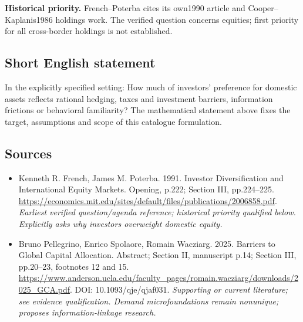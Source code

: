 \documentclass[11pt]{article}
\begin{document}
\par\textbf{Historical priority.} French–Poterba cites its own1990 article and Cooper–Kaplanis1986 holdings work. The verified question concerns equities; first priority for all cross-border holdings is not established.

\subsection{Short English statement}
In the explicitly specified setting: How much of investors’ preference for domestic assets reflects rational hedging, taxes and investment barriers, information frictions or behavioral familiarity? The mathematical statement above fixes the target, assumptions and scope of this catalogue formulation.

\subsection{Sources}
\begin{itemize}\raggedright
\item[\textnormal{[S1]}]\hypertarget{source:30007620:1}{} Kenneth R. French, James M. Poterba. 1991. Investor Diversification and International Equity Markets. Opening, p.222; Section III, pp.224–225.
\url{https://economics.mit.edu/sites/default/files/publications/2006858.pdf}.
{\small\textit{Earliest verified question/agenda reference; historical priority qualified below. Explicitly asks why investors overweight domestic equity.}}

\item[\textnormal{[S2]}]\hypertarget{source:30007620:2}{} Bruno Pellegrino, Enrico Spolaore, Romain Wacziarg. 2025. Barriers to Global Capital Allocation. Abstract; Section II, manuscript p.14; Section III, pp.20–23, footnotes 12 and 15.
\url{https://www.anderson.ucla.edu/faculty_pages/romain.wacziarg/downloads/2025_GCA.pdf}.
DOI: 10.1093/qje/qjaf031.
{\small\textit{Supporting or current literature; see evidence qualification. Demand microfoundations remain nonunique; proposes information-linkage research.}}
\end{itemize}
\end{document}

